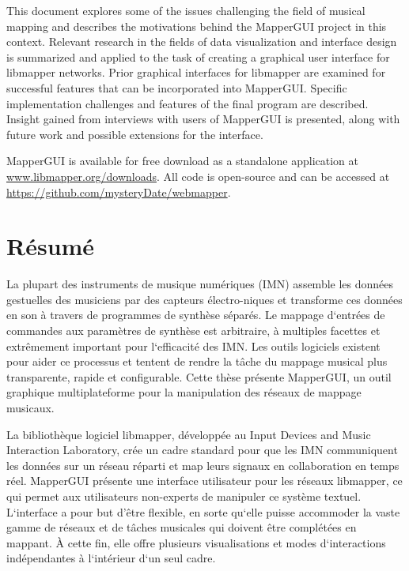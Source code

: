 \documentclass [12pt, letterpaper]{report}
\begin{document}
This document explores some of the issues challenging the field of musical mapping and describes the motivations behind the MapperGUI project in this context. Relevant research in the fields of data visualization and interface design is summarized and applied to the task of creating a graphical user interface for libmapper networks. Prior graphical interfaces for libmapper are examined for successful features that can be incorporated into MapperGUI. Specific implementation challenges and features of the final program are described. Insight gained from interviews with users of MapperGUI is presented, along with future work and possible extensions for the interface.

MapperGUI is available for free download as a standalone application at \url{www.libmapper.org/downloads}. All code is open-source and can be accessed at \url{https://github.com/mysteryDate/webmapper}.

\newpage

\section*{\centering R\'esum\'e}

La plupart des instruments de musique num\'eriques (IMN) assemble les donn\'ees gestuelles des musiciens par des capteurs \'electro-niques et transforme ces donn\'ees en son \`a travers de programmes de synth\`ese s\'epar\'es.
Le mappage d`entr\'ees de commandes aux param\`etres de synth\`ese est arbitraire, \`a multiples facettes et extr\^emement important pour l`efficacit\'e des IMN.
Les outils logiciels existent pour aider ce processus et tentent de rendre la t\^ache du mappage musical plus transparente, rapide et configurable.
Cette th\`ese pr\'esente MapperGUI, un outil graphique multiplateforme pour la manipulation des r\'eseaux de mappage musicaux.

La biblioth\`eque logiciel libmapper, d\'evelopp\'ee au Input Devices and Music Interaction Laboratory, cr\'ee un cadre standard pour que les IMN communiquent les donn\'ees sur un r\'eseau r\'eparti et map leurs signaux en collaboration en temps r\'eel.
MapperGUI pr\'esente une interface utilisateur pour les r\'eseaux libmapper, ce qui permet aux utilisateurs non-experts de manipuler ce syst\`eme textuel.
L`interface a pour but d’\^etre flexible, en sorte qu`elle puisse accommoder la vaste gamme de r\'eseaux et de t\^aches musicales qui doivent \^etre compl\'et\'ees en mappant.
\`A cette fin, elle offre plusieurs visualisations et modes d`interactions ind\'ependantes \`a l`int\'erieur d`un seul cadre.    
\end{document}
